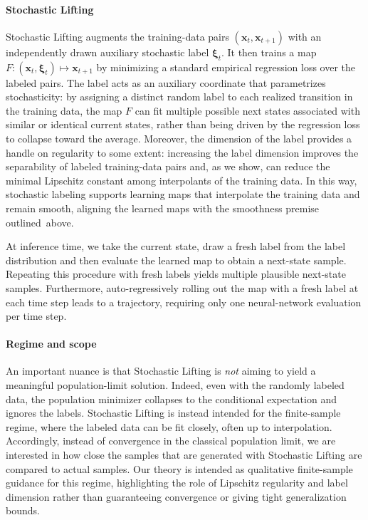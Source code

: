 \documentclass{article}
\theoremstyle{plain}
\theoremstyle{definition}
\theoremstyle{remark}
\newcommand{\bfxi}{{\bm \xi}}
\newcommand{\x}{\bm{x}}
\begin{document}
\vspace*{-0.15cm}\paragraph{Stochastic Lifting}
Stochastic Lifting augments the  training-data pairs $(\x_t, \x_{t + 1})$ with an independently drawn auxiliary stochastic label $\bfxi_t$. It then trains a map $F: (\x_t, \bfxi_t) \mapsto \x_{t + 1}$ by minimizing a standard empirical regression loss over the labeled pairs. The label acts as an auxiliary coordinate that parametrizes stochasticity: by assigning a distinct random label to each realized transition in the training data, the map $F$ can fit multiple possible next states associated with similar or identical current states, rather than being driven by the regression loss to collapse toward the average.
Moreover, the dimension of the label provides a handle on regularity to some extent: increasing the label dimension improves the separability of labeled training-data pairs and, as we show, can reduce the minimal Lipschitz constant among interpolants of the training data. In this way, stochastic labeling supports learning maps that interpolate the training data and remain smooth, aligning the learned maps with the smoothness premise outlined~above. 

At inference time, we take the current state, draw a fresh label from the label distribution and then evaluate the learned map to obtain a next-state sample. Repeating this procedure with fresh labels yields multiple plausible next-state samples. Furthermore, auto-regressively rolling out the map with a fresh label at each time step leads to a trajectory, requiring only one neural-network evaluation per time step.

\vspace*{-0.2cm}\paragraph{Regime and scope}
An important nuance is that Stochastic Lifting is \emph{not} aiming to yield a meaningful population-limit solution. Indeed, even with the randomly labeled data, the population minimizer collapses to the conditional expectation and ignores the labels. Stochastic Lifting is instead intended for the  finite-sample regime, where the labeled data can be fit closely, often up to interpolation. Accordingly, instead of convergence in the classical population limit, we are interested in how close the samples that are generated with Stochastic Lifting are compared to actual samples. Our theory is intended as qualitative finite-sample guidance for this regime, highlighting the role of Lipschitz regularity and label dimension rather than guaranteeing convergence or giving tight generalization bounds. 
\end{document}

